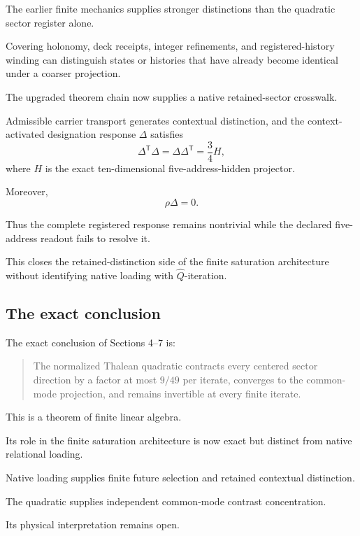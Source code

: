 The earlier finite mechanics supplies stronger distinctions than the
quadratic sector register alone.

Covering holonomy, deck receipts, integer refinements, and
registered-history winding can distinguish states or histories that
have already become identical under a coarser projection.

The upgraded theorem chain now supplies a native retained-sector
crosswalk.

Admissible carrier transport generates contextual distinction, and
the context-activated designation response \(\Delta\) satisfies
\[
\Delta^{\mathsf T}\Delta
=
\Delta\Delta^{\mathsf T}
=
\frac34H,
\]
where \(H\) is the exact ten-dimensional five-address-hidden
projector.

Moreover,
\[
\rho\Delta=0.
\]

Thus the complete registered response remains nontrivial while the
declared five-address readout fails to resolve it.

This closes the retained-distinction side of the finite saturation
architecture without identifying native loading with
\(\widehat Q\)-iteration.

\subsection{The exact conclusion}


The exact conclusion of Sections 4--7 is:

\begin{quote}
The normalized Thalean quadratic contracts every centered sector
direction by a factor at most \(9/49\) per iterate, converges to the
common-mode projection, and remains invertible at every finite
iterate.
\end{quote}

This is a theorem of finite linear algebra.

Its role in the finite saturation architecture is now exact but
distinct from native relational loading.

Native loading supplies finite future selection and retained
contextual distinction.

The quadratic supplies independent common-mode contrast
concentration.

Its physical interpretation remains open.
